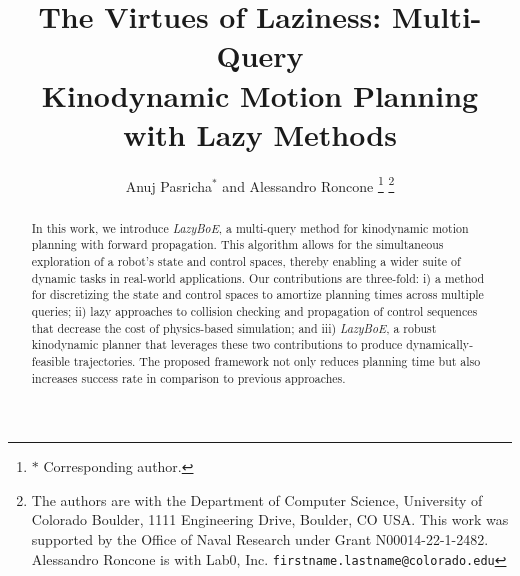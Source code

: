 \documentclass[letterpaper, 10 pt, conference]{ieeeconf}  %
\theoremstyle{definition}
\begin{document}
\title{\LARGE \bf
The Virtues of Laziness: Multi-Query\\ Kinodynamic Motion Planning with Lazy Methods
}



\author{Anuj Pasricha$^*$ and Alessandro Roncone%
\thanks{$*$ Corresponding author.}%
\thanks{The authors are with the Department of Computer Science, University of Colorado Boulder, 1111 Engineering Drive, Boulder, CO USA. This work was supported by the Office of Naval Research under Grant N00014-22-1-2482. Alessandro Roncone is with Lab0, Inc. {\tt\small firstname.lastname@colorado.edu}}%
}



\maketitle
\thispagestyle{empty}
\pagestyle{empty}


\begin{abstract}
In this work, we introduce \textsl{LazyBoE}, a multi-query method for kinodynamic motion planning with forward propagation. This algorithm allows for the simultaneous exploration of a robot's state and control spaces, thereby enabling a wider suite of dynamic tasks in real-world applications. Our contributions are three-fold: i) a method for discretizing the state and control spaces to amortize planning times across multiple queries; ii) lazy approaches to collision checking and propagation of control sequences that decrease the cost of physics-based simulation; and iii) \textsl{LazyBoE}, a robust kinodynamic planner that leverages these two contributions to produce dynamically-feasible trajectories. The proposed framework not only reduces planning time but also increases success rate in comparison to previous approaches.
\end{abstract}







% 
% 

\AtNextBibliography{\footnotesize}
\printbibliography
\end{document}
